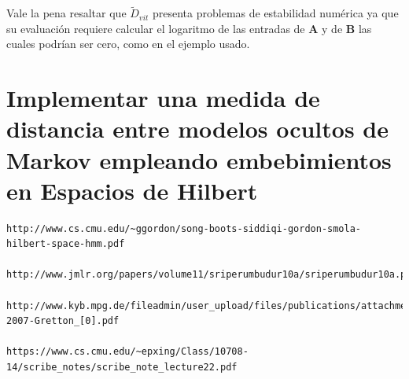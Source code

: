 \documentclass[a4paper]{article}
\begin{document}
Vale la pena resaltar que $\widetilde{D}_{vit}$ presenta
problemas de estabilidad numérica ya que su evaluación requiere
calcular el logaritmo de las entradas de $\mathbf{A}$ y de
$\mathbf{B}$ las cuales podrían ser cero, como en el ejemplo usado.

\section{Implementar una medida de distancia entre modelos ocultos de Markov empleando embebimientos en Espacios de Hilbert}

\begin{verbatim}
http://www.cs.cmu.edu/~ggordon/song-boots-siddiqi-gordon-smola-hilbert-space-hmm.pdf

http://www.jmlr.org/papers/volume11/sriperumbudur10a/sriperumbudur10a.pdf

http://www.kyb.mpg.de/fileadmin/user_upload/files/publications/attachments/ALT-2007-Gretton_[0].pdf

https://www.cs.cmu.edu/~epxing/Class/10708-14/scribe_notes/scribe_note_lecture22.pdf
\end{verbatim}

{}

\end{document}
